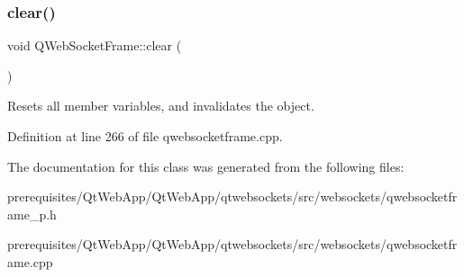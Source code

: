 \subsubsection{\texorpdfstring{clear()}{clear()}}
{\footnotesize\ttfamily void Q\+Web\+Socket\+Frame\+::clear (\begin{DoxyParamCaption}{ }\end{DoxyParamCaption})}

Resets all member variables, and invalidates the object. 

Definition at line 266 of file qwebsocketframe.\+cpp.



The documentation for this class was generated from the following files\+:\begin{DoxyCompactItemize}
\item 
prerequisites/\+Qt\+Web\+App/\+Qt\+Web\+App/qtwebsockets/src/websockets/qwebsocketframe\+\_\+p.\+h\item 
prerequisites/\+Qt\+Web\+App/\+Qt\+Web\+App/qtwebsockets/src/websockets/qwebsocketframe.\+cpp\end{DoxyCompactItemize}
